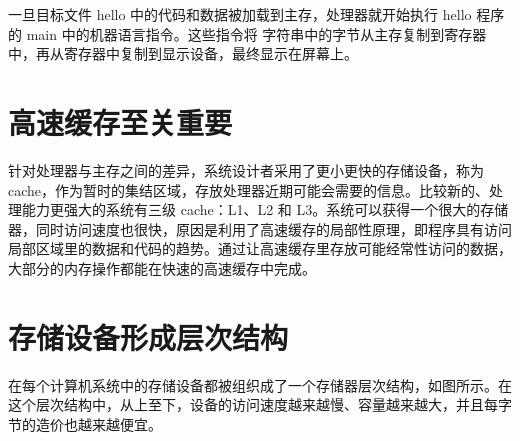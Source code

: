一旦目标文件 hello 中的代码和数据被加载到主存，处理器就开始执行 hello 程序的 main 中的机器语言指令。这些指令将  字符串中的字节从主存复制到寄存器中，再从寄存器中复制到显示设备，最终显示在屏幕上。

\section{高速缓存至关重要}

针对处理器与主存之间的差异，系统设计者采用了更小更快的存储设备，称为 cache，作为暂时的集结区域，存放处理器近期可能会需要的信息。比较新的、处理能力更强大的系统有三级 cache：L1、L2 和 L3。系统可以获得一个很大的存储器，同时访问速度也很快，原因是利用了高速缓存的局部性原理，即程序具有访问局部区域里的数据和代码的趋势。通过让高速缓存里存放可能经常性访问的数据，大部分的内存操作都能在快速的高速缓存中完成。

\section{存储设备形成层次结构}

在每个计算机系统中的存储设备都被组织成了一个存储器层次结构，如图所示。在这个层次结构中，从上至下，设备的访问速度越来越慢、容量越来越大，并且每字节的造价也越来越便宜。

